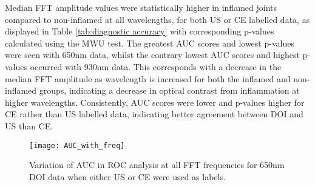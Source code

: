 \documentclass[twoside]{bhamthesis}
\theoremstyle{definition}
\begin{document}
Median FFT amplitude values were statistically higher in inflamed joints compared to non-inflamed at all wavelengths, for both US or CE labelled data, as displayed in Table \ref{tab:diagnostic accuracy} with corresponding p-values calculated using the MWU test. The greatest AUC scores and lowest p-values were seen with 650nm data, whilst the contrary lowest AUC scores and highest p-values occurred with 930nm data. This corresponds with a decrease in the median FFT amplitude as wavelength is increased for both the inflamed and non-inflamed groups, indicating a decrease in optical contrast from inflammation at higher wavelengths. Consistently, AUC scores were lower and p-values higher for CE rather than US labelled data, indicating better agreement between DOI and US than CE.

\begin{comment}
\begin{table}[ht]
\caption{Median values and p-values for inflamed versus non-inflamed at a threshold of 0.135. For all wavelengths when either CE or US were used as class labels.} 
\label{tab:diagnostic accuracy}
\begin{center}       
\begin{tabular}{c c c c c} 
\hline
\rule[-1ex]{0pt}{3.5ex} \multirow{ 2}{*}{$\lambda$ (nm)} & \multicolumn{2}{c}{CE} & \multicolumn{2}{c}{US} \\
\rule[-1ex]{0pt}{3.5ex} & AUC &  p-value & AUC & p-value \\
\hline
\rule[-1ex]{0pt}{3.5ex}  650 & 0.801 & 0.00000166 & 0.888 & 0.00000000757 \\
\rule[-1ex]{0pt}{3.5ex}  710 & 0.780 & 0.00000844 & 0.877 & 0.0000000201\textcolor{white}{0} \\
\rule[-1ex]{0pt}{3.5ex}  730 & 0.787 & 0.00000493 & 0.880 & 0.0000000141\textcolor{white}{0}\\
\rule[-1ex]{0pt}{3.5ex}  830 & 0.767 & 0.0000189\textcolor{white}{0} & 0.877 & 0.0000000201\textcolor{white}{0}\\
\rule[-1ex]{0pt}{3.5ex}  930 & 0.769 & 0.0000181\textcolor{white}{0} & 0.859 &  0.0000000906\textcolor{white}{0}\\
\hline
\end{tabular}
\end{center}
\end{table}
\textcolor{black}{text}
\end{comment}

\begin{figure}[!ht]
\centering\texttt{[image: AUC\_with\_freq]}\caption{Variation of AUC in ROC analysis at all FFT frequencies for 650nm DOI data when either US or CE were used as labels.}
\label{fig:Freq_variation}
\end{figure}
\end{document}
